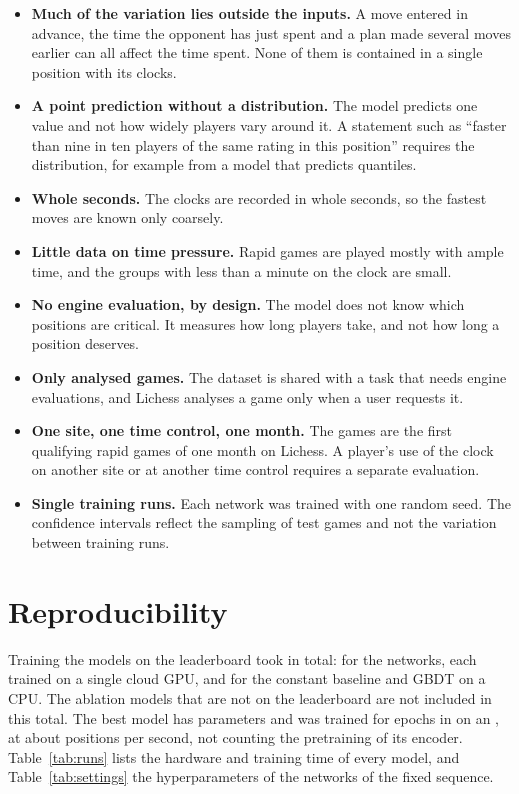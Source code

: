 \documentclass[11pt]{article}
\begin{document}
\begin{itemize}
\item \textbf{Much of the variation lies outside the inputs.} A move entered
in advance, the time the opponent has just spent and a plan made several
moves earlier can all affect the time spent. None of them is contained in a
single position with its clocks.
\item \textbf{A point prediction without a distribution.} The model predicts
one value and not how widely players vary around it. A statement such as
``faster than nine in ten players of the same rating in this position''
requires the distribution, for example from a model that predicts quantiles.
\item \textbf{Whole seconds.} The clocks are recorded in whole seconds, so
the fastest moves are known only coarsely.
\item \textbf{Little data on time pressure.} Rapid games are played mostly
with ample time, and the groups with less than a minute on the clock are
small.
\item \textbf{No engine evaluation, by design.} The model does not know which
positions are critical. It measures how long players take, and not how long a
position deserves.
\item \textbf{Only analysed games.} The dataset is shared with a task that
needs engine evaluations, and Lichess analyses a game only when a user
requests it.
\item \textbf{One site, one time control, one month.} The games are the
first qualifying rapid games of one month on Lichess. A player's use of the
clock on another site or at another time control requires a separate
evaluation.
\item \textbf{Single training runs.} Each network was trained with one
random seed. The confidence intervals reflect the sampling of test games and
not the variation between training runs.
\end{itemize}

\section{Reproducibility}
\label{sec:cost}

Training the  models on the leaderboard took 
in total:  for the networks, each trained on a
single cloud GPU, and  for the constant baseline and
GBDT on a CPU. The ablation models that are not on the leaderboard are not
included in this total. The best model has  parameters and
was trained for  epochs in  on an
, at about  positions per second, not
counting the pretraining of its encoder. Table~\ref{tab:runs} lists
the hardware and training time of every model, and
Table~\ref{tab:settings} the hyperparameters of the networks of the fixed
sequence.
\end{document}

